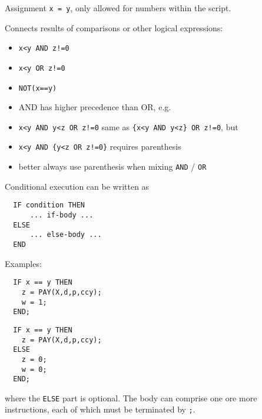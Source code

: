 
Assignment {\tt x = y}, only allowed for numbers within the script.


Connects results of comparisons or other logical expressions:

\begin{itemize}
\item {\tt x<y AND z!=0}
\item {\tt x<y OR z!=0}
\item {\tt NOT(x==y)}
\item AND has higher precedence than OR, e.g.
\item {\tt x<y AND y<z OR z!=0} same as {\tt \{x<y AND y<z\} OR z!=0}, but
\item {\tt x<y AND \{y<z OR z!=0\}} requires parenthesis
\item better always use parenthesis when mixing {\tt AND} / {\tt OR}
\end{itemize}


Conditional execution can be written as

\begin{verbatim}
  IF condition THEN
      ... if-body ...
  ELSE
      ... else-body ...
  END
\end{verbatim}

Examples:

\begin{verbatim}
  IF x == y THEN
    z = PAY(X,d,p,ccy);
    w = 1;
  END;
\end{verbatim}
  
\begin{verbatim}
  IF x == y THEN
    z = PAY(X,d,p,ccy);
  ELSE
    z = 0;
    w = 0;
  END;
\end{verbatim}

where the \verb+ELSE+ part is optional. The body can comprise one ore more instructions, each of which must be
terminated by {\tt ;}.

